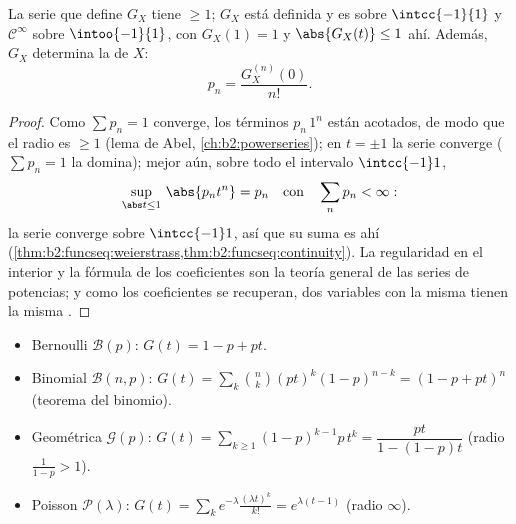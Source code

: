\begin{proposition}\label{prop:b2:genfun:radius}
La serie que define $G_X$ tiene  $\geq 1$; $G_X$
está definida y es  sobre $\intcc{-1}{1}$ y $\mathcal{C}^\infty$
sobre $\intoo{-1}{1}$, con $G_X(1) = 1$ y $\abs{G_X(t)} \leq 1$ ahí.
Además, $G_X$ determina la  de $X$:
\[
p_n = \frac{G_X^{(n)}(0)}{n!} .
\]
\end{proposition}

\begin{proof}
Como $\sum p_n = 1$ converge, los términos $p_n\,1^n$ están acotados,
de modo que el radio es $\geq 1$ (lema de Abel,
\cref{ch:b2:powerseries}); en $t = \pm1$ la serie converge
 ($\sum p_n = 1$ la domina); mejor aún, sobre todo el
intervalo $\intcc{-1}1$,
\[
\sup_{\abs t\leq1}\,\abs{p_nt^n} = p_n
\quad\text{con}\quad \sum_np_n < \infty :
\]
la serie converge \emph{} sobre $\intcc{-1}1$, así que su
suma es  ahí
(\cref{thm:b2:funcseq:weierstrass,thm:b2:funcseq:continuity}). La
regularidad en el interior y la fórmula de los coeficientes son la
teoría general de las series de potencias; y como los coeficientes se
recuperan, dos variables con la misma  tienen la
misma .
\end{proof}

\begin{example}\label{ex:b2:genfun:classical}
\leavevmode
\begin{itemize}
\item Bernoulli $\mathcal{B}(p)$: $G(t) = 1 - p + pt$.
\item Binomial $\mathcal{B}(n, p)$: $G(t) = \sum_k \binom nk
(pt)^k(1-p)^{n-k} = (1 - p + pt)^n$ (teorema del binomio).
\item Geométrica $\mathcal{G}(p)$: $G(t) =
\sum_{k\geq1}(1-p)^{k-1}p\,t^k = \dfrac{pt}{1 - (1-p)t}$ (radio
$\frac{1}{1-p} > 1$).
\item Poisson $\mathcal{P}(\lambda)$: $G(t) = \sum_k
e^{-\lambda}\frac{(\lambda t)^k}{k!} = e^{\lambda(t - 1)}$ (radio
$\infty$).
\end{itemize}
\end{example}

